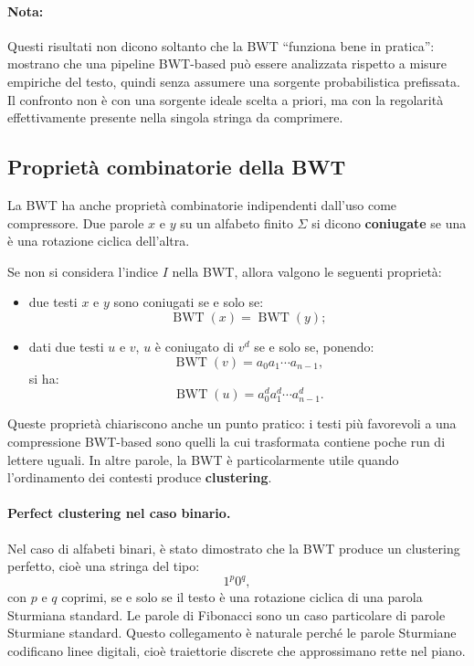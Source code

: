 \documentclass{article}
\theoremstyle{definition}
\numberwithin{equation}{section}
\begin{document}
\paragraph{Nota:}
Questi risultati non dicono soltanto che la BWT ``funziona bene in pratica'': mostrano che una pipeline BWT-based può essere analizzata rispetto a misure empiriche del testo, quindi senza assumere una sorgente probabilistica prefissata. Il confronto non è con una sorgente ideale scelta a priori, ma con la regolarità effettivamente presente nella singola stringa da comprimere.

\subsection{Proprietà combinatorie della BWT}
La BWT ha anche proprietà combinatorie indipendenti dall'uso come compressore. Due parole $x$ e $y$ su un alfabeto finito $\Sigma$ si dicono \textbf{coniugate} se una è una rotazione ciclica dell'altra.

Se non si considera l'indice $I$ nella BWT, allora valgono le seguenti proprietà:
\begin{itemize}
    \item due testi $x$ e $y$ sono coniugati se e solo se:
          \[
              \operatorname{BWT}(x)=\operatorname{BWT}(y);
          \]
    \item dati due testi $u$ e $v$, $u$ è coniugato di $v^d$ se e solo se, ponendo:
          \[
              \operatorname{BWT}(v)=a_0a_1\cdots a_{n-1},
          \]
          si ha:
          \[
              \operatorname{BWT}(u)=a_0^d a_1^d\cdots a_{n-1}^d.
          \]
\end{itemize}

Queste proprietà chiariscono anche un punto pratico: i testi più favorevoli a una compressione BWT-based sono quelli la cui trasformata contiene poche run di lettere uguali. In altre parole, la BWT è particolarmente utile quando l'ordinamento dei contesti produce \textbf{clustering}.

\paragraph{Perfect clustering nel caso binario.}
Nel caso di alfabeti binari, è stato dimostrato che la BWT produce un clustering perfetto, cioè una stringa del tipo:
\[
    1^p0^q,
\]
con $p$ e $q$ coprimi, se e solo se il testo è una rotazione ciclica di una parola Sturmiana standard. Le parole di Fibonacci sono un caso particolare di parole Sturmiane standard. Questo collegamento è naturale perché le parole Sturmiane codificano linee digitali, cioè traiettorie discrete che approssimano rette nel piano.
\end{document}
